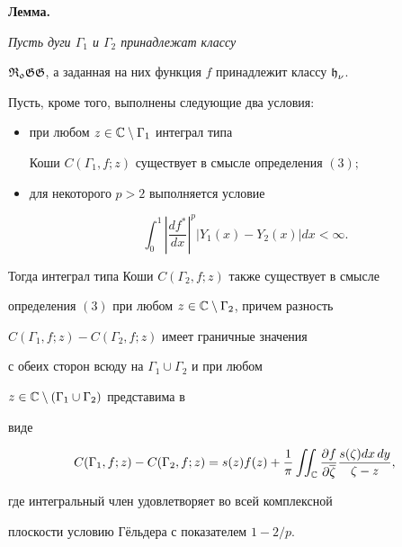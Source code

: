 {\bf Лемма.} {\it Пусть дуги $\Gamma_1$ и $\Gamma_2$ принадлежат классу


$\operatorname{\frak {R_{0}GG}}$, а заданная на них функция $f$ принадлежит классу $\operatorname{\frak h}_{\nu}$.


Пусть, кроме того, выполнены следующие два условия$:$


\begin{itemize}


\item[(i)] при любом $z\in {\Bbb C}\setminus\Gamma_1$ интеграл типа


Коши $C(\Gamma_1, f;z)$ существует в смысле определения $(3);$


\item[(ii)] для некоторого $p>2$ выполняется условие


\begin{equation}


\int_{0}^{1}{\left|\frac{df^*}{dx}\right|^{p}


\left|Y_{1}(x) - Y_{2}(x)\right|dx} < \infty.


\end{equation}


\end{itemize}


Тогда интеграл типа Коши $C(\Gamma_2, f;z)$ также существует в смысле


определения $(3)$ при любом $z\in{\Bbb C}\setminus\Gamma_2$, причем разность


$C(\Gamma_1, f;z) - C(\Gamma_2, f;z)$ имеет граничные значения


с обеих сторон всюду на $\Gamma_1\cup\Gamma_2$ и при любом


$z\in {\Bbb C}\setminus (\Gamma_1\cup\Gamma_2)$ представима в


виде


\begin{equation}


C(\Gamma_1, f;z) - C(\Gamma_2, f;z) = s(z)f(z) + \frac{1}{\pi}


\iint_{\Bbb C}{\frac{\partial f}{\partial \overline{\zeta}}


\frac{s(\zeta)dx\,dy}{\zeta - z}},


\end{equation}


где интегральный член удовлетворяет во всей комплексной


плоскости условию Г\"ельдера с показателем $1-2/p$.


}





